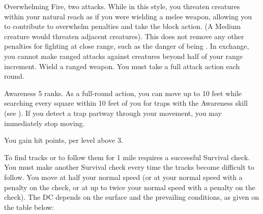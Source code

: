 \featpre Overwhelming Fire, two attacks.
\featben While in this style, you threaten creatures within your natural reach as if you were wielding a melee weapon, allowing you to contribute to overwhelm penalties and take the block action.
(A Medium creature would threaten adjacent creatures).
This does not remove any other penalties for fighting at close range, such as the danger of being .
In exchange, you cannot make ranged attacks against creatures beyond half of your range increment.
\stylereq Wield a ranged weapon.
You must take a full attack action each round.

\featpre Awareness 5 ranks.
\featben As a full-round action, you can move up to 10 feet while searching every square within 10 feet of you for traps with the Awareness skill (see ).
If you detect a trap partway through your movement, you may immediately stop moving.

\featben You gain  hit points,  per level above 3.

\featben To find tracks or to follow them for 1 mile requires a successful Survival check.
You must make another Survival check every time the tracks become difficult to follow.
You move at half your normal speed (or at your normal speed with a  penalty on the check, or at up to twice your normal speed with a  penalty on the check).
The DC depends on the surface and the prevailing conditions, as given on the table below:

